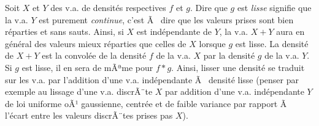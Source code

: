 {{\begin{eur}[Convolution des densités = addition d'un bruit indépendant sur la v.a.]
  Soit $X$ et $Y$ des v.a. de densités respectives $f$ et $g$.  Dire que $g$
  est \emph{lisse} signifie que la v.a. $Y$ est purement \emph{continue},
  c'est Ã  dire que les valeurs prises sont bien réparties et sans sauts.
  Ainsi, si $X$ est indépendante de $Y$, la v.a. $X+Y$ aura en général des
  valeurs mieux réparties que celles de $X$ lorsque $g$ est lisse.  La densité
  de $X+Y$ est la convolée de la densité $f$ de la v.a. $X$ par la densité $g$
  de la v.a. $Y$.  Si $g$ est lisse, il en sera de mÃªme pour $f*g$.  Ainsi,
  lisser une densité se traduit sur les v.a. par l'addition d'une v.a.
  indépendante Ã  densité lisse (penser par exemple au lissage d'une v.a.
  discrÃ¨te $X$ par addition d'une v.a. indépendante $Y$ de loi uniforme oÃ¹
  gaussienne, centrée et de faible variance par rapport Ã  l'écart entre les
  valeurs discrÃ¨tes prises pas $X$).
\end{eur}

}}
